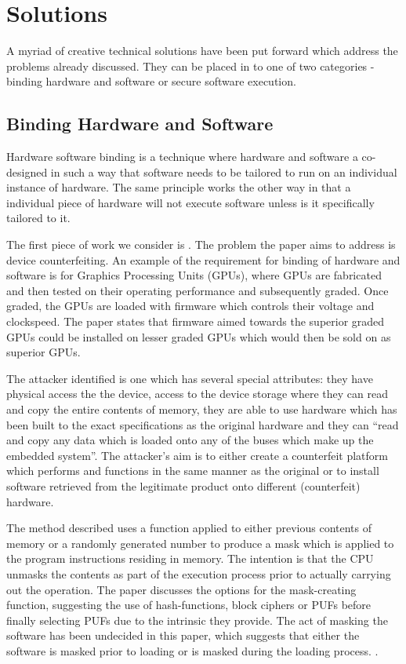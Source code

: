 \section{Solutions}

A myriad of creative technical solutions have been put forward which address the problems already discussed. They can be placed in to one of two categories - binding hardware and software or secure software execution.

\subsection{Binding Hardware and Software}

Hardware software binding is a technique where hardware and software a co-designed in such a way that software needs to be tailored to run on an individual instance of hardware. The same principle works the other way in that a individual piece of hardware will not execute software unless is it specifically tailored to it.


The first piece of work we consider is \cite{Lee2016}. The problem the paper aims to address is device counterfeiting. An example of the requirement for binding of hardware and software is for Graphics Processing Units (GPUs), where GPUs are fabricated and then tested on their operating performance and subsequently graded. Once graded, the GPUs are loaded with firmware which controls their voltage and clockspeed. The paper states that firmware aimed towards the superior graded GPUs could be installed on lesser graded GPUs which would then be sold on as superior GPUs.

The attacker identified is one which has several special attributes: they have physical access the the device, access to the device storage where they can read and copy the entire contents of memory, they are able to use hardware which has been built to the exact specifications as the original hardware and they can ``read and copy any data which is loaded onto any of the buses which make up the embedded system''. The attacker's aim is to either create a counterfeit platform which performs and functions in the same manner as the original or to install software retrieved from the legitimate product onto different (counterfeit) hardware.

The method described uses a function applied to either previous contents of memory or a randomly generated number to produce a mask which is applied to the program instructions residing in memory. The intention is that the CPU unmasks the contents as part of the execution process prior to actually carrying out the operation. The paper discusses the options for the mask-creating function, suggesting the use of hash-functions, block ciphers or PUFs before finally selecting PUFs due to the intrinsic they provide. The act of masking the software has been undecided in this paper, which suggests that either the software is masked prior to loading or is masked during the loading process. .


